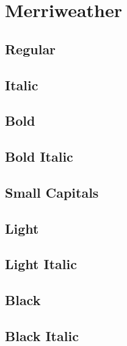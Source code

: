 \documentclass{article}
\begin{document}
\section{Merriweather}
\subsection*{Regular}
\lipsum[1]

\subsection*{Italic}
\textit{\lipsum[2]}


\subsection*{Bold}
\textbf{\lipsum[3]}

\subsection*{Bold Italic}

\textbf{\textit{\lipsum[4]}}

\subsection*{Small Capitals}

\textsc{\lipsum[9]}

\subsection*{Light}

{\merriweatherlight\lipsum[5]}


\subsection*{Light Italic}

\textit{\merriweatherlight\lipsum[6]}

\subsection*{Black}

{\merriweatherblack\lipsum[7]}


\subsection*{Black Italic}
\end{document}
